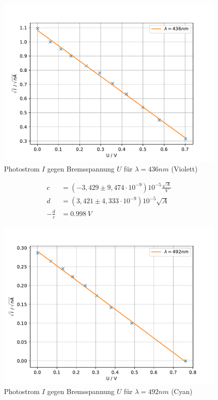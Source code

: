 \begin{figure}[h!]
  \centering
  \includegraphics[width=\textwidth]{Violett436.pdf}
  \caption{Photostrom $I$ gegen Bremsspannung $U$ für $\lambda=436nm$ (Violett)}
  \label{fig:v436}
\end{figure}
\FloatBarrier
\begin{align*}
  c &= (-3,429 \pm 9,474 \cdot 10^{-9}) 10^{-5}\si{\frac{\sqrt{A}}{V}}\\
  d &= (3,421 \pm 4,333 \cdot 10^{-9}) 10^{-5}\si{\sqrt{A}}\\
  -\frac{d}{c} &= \SI{0.998}{V}
\end{align*}
\FloatBarrier

\FloatBarrier
\begin{figure}[h!]
  \centering
  \includegraphics[width=\textwidth]{Cyan492.pdf}
  \caption{Photostrom $I$ gegen Bremsspannung $U$ für $\lambda=492nm$ (Cyan)}
  \label{fig:g492}
\end{figure}
